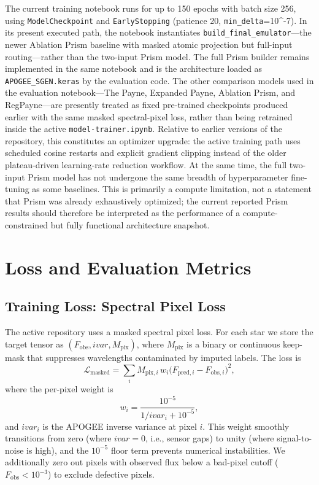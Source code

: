 \documentclass[preprint]{aastex701-1/aastex701}
\begin{document}
The current training notebook runs for up to 150 epochs with batch size 256, using
\texttt{ModelCheckpoint} and \texttt{EarlyStopping} (patience 20,
\texttt{min\_delta}=10^{-7}). In its present executed path, the notebook instantiates
\texttt{build\_final\_emulator}---the newer Ablation Prism baseline with masked atomic
projection but full-input routing---rather than the two-input Prism model. The full
Prism builder remains implemented in the same notebook and is the architecture loaded as
\texttt{APOGEE\_SGEN.keras} by the evaluation code. The other comparison models used in the
evaluation notebook---The Payne, Expanded Payne, Ablation Prism, and RegPayne---are
presently treated as fixed pre-trained checkpoints produced earlier with the same masked
spectral-pixel loss, rather than being retrained inside the active
\texttt{model-trainer.ipynb}. Relative to earlier versions of the repository, this
constitutes an optimizer upgrade: the active training path uses scheduled cosine restarts
and explicit gradient clipping instead of the older plateau-driven learning-rate reduction
workflow. At the same time, the full two-input Prism model has not undergone the same
breadth of hyperparameter fine-tuning as some baselines. This is primarily a compute
limitation, not a statement that Prism was already exhaustively optimized; the current
reported Prism results should therefore be interpreted as the performance of a
compute-constrained but fully functional architecture snapshot.

\section{Loss and Evaluation Metrics}
\label{sec:loss}

\subsection{Training Loss: Spectral Pixel Loss}
\label{subsec:spl_loss}

The active repository uses a masked spectral pixel loss. For each star we store the target
tensor as $(F_{\mathrm{obs}}, \mathit{ivar}, M_\mathrm{pix})$, where $M_\mathrm{pix}$ is a
binary or continuous keep-mask that suppresses wavelengths contaminated by imputed labels.
The loss is
\begin{equation}
\mathcal{L}_\mathrm{masked} = \sum_{i}
  M_{\mathrm{pix},i}\,w_i \bigl(F_{\mathrm{pred},i} - F_{\mathrm{obs},i}\bigr)^2,
\label{eq:spl_loss}
\end{equation}
where the per-pixel weight is
\begin{equation}
w_i = \frac{10^{-5}}{1/\mathit{ivar}_i + 10^{-5}},
\label{eq:spl_weight}
\end{equation}
and $\mathit{ivar}_i$ is the APOGEE inverse variance at pixel $i$. This weight smoothly
transitions from zero (where $\mathit{ivar} = 0$, i.e., sensor gaps) to unity (where
signal-to-noise is high), and the $10^{-5}$ floor term prevents numerical instabilities.
We additionally zero out pixels with observed flux below a bad-pixel cutoff
($F_\mathrm{obs} < 10^{-3}$) to exclude defective pixels.
\end{document}
